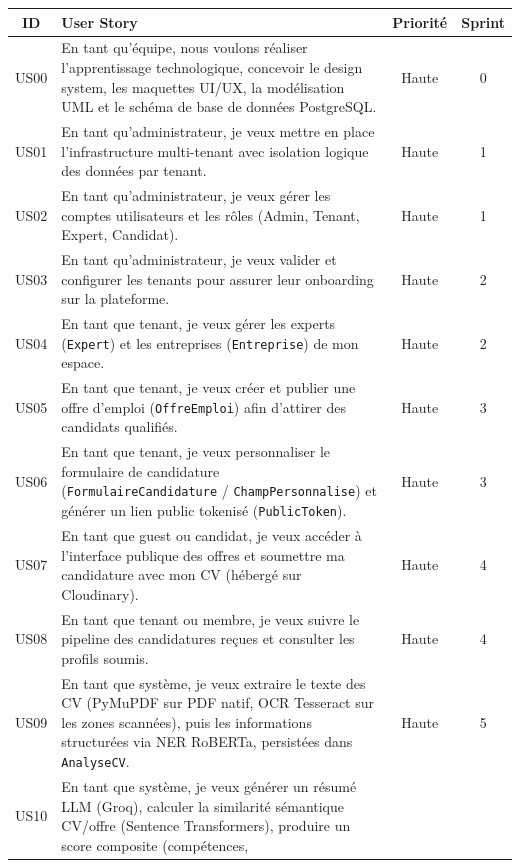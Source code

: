 \begin{table}[h]
\centering
\renewcommand{\arraystretch}{1.4}
\begin{tabular}{|c|p{8.5cm}|c|c|}
\hline
\textbf{ID} & \textbf{User Story} & \textbf{Priorité} & \textbf{Sprint} \\
\hline
US00 & En tant qu'équipe, nous voulons réaliser l'apprentissage technologique, concevoir
le design system, les maquettes UI/UX, la modélisation UML et le schéma de base de données
PostgreSQL. & Haute & 0 \\
\hline
US01 & En tant qu'administrateur, je veux mettre en place l'infrastructure multi-tenant
avec isolation logique des données par tenant. & Haute & 1 \\
\hline
US02 & En tant qu'administrateur, je veux gérer les comptes utilisateurs et les rôles
(Admin, Tenant, Expert, Candidat). & Haute & 1 \\
\hline
US03 & En tant qu'administrateur, je veux valider et configurer les tenants pour assurer
leur onboarding sur la plateforme. & Haute & 2 \\
\hline
US04 & En tant que tenant, je veux gérer les experts (\texttt{Expert}) et les entreprises
(\texttt{Entreprise}) de mon espace. & Haute & 2 \\
\hline
US05 & En tant que tenant, je veux créer et publier une offre d'emploi (\texttt{OffreEmploi})
afin d'attirer des candidats qualifiés. & Haute & 3 \\
\hline
US06 & En tant que tenant, je veux personnaliser le formulaire de candidature
(\texttt{FormulaireCandidature} / \texttt{ChampPersonnalise}) et générer un lien
public tokenisé (\texttt{PublicToken}). & Haute & 3 \\
\hline
US07 & En tant que guest ou candidat, je veux accéder à l'interface publique des offres
et soumettre ma candidature avec mon CV (hébergé sur Cloudinary). & Haute & 4 \\
\hline
US08 & En tant que tenant ou membre, je veux suivre le pipeline des candidatures reçues
et consulter les profils soumis. & Haute & 4 \\
\hline
US09 & En tant que système, je veux extraire le texte des CV (PyMuPDF sur PDF natif,
OCR Tesseract sur les zones scannées), puis les informations structurées via NER RoBERTa,
persistées dans \texttt{AnalyseCV}. & Haute & 5 \\
\hline
US10 & En tant que système, je veux générer un résumé LLM (Groq), calculer la similarité
sémantique CV/offre (Sentence Transformers), produire un score composite (compétences,

\end{tabular}
\end{table}
